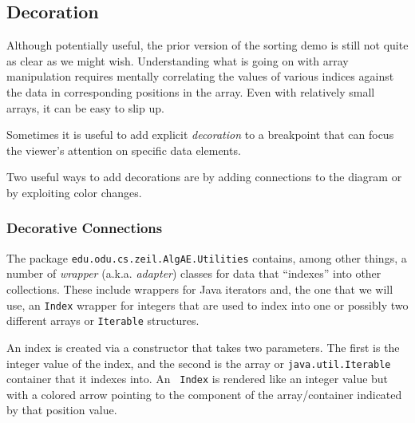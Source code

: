 \documentclass[11pt,titlepage]{book}
\begin{document}
\subsection{Decoration}

Although potentially useful, the prior version of the sorting demo is
still not quite as clear as we might wish. Understanding what is going
on with array manipulation requires mentally correlating the values of
various indices against the data in corresponding positions in the
array. Even with relatively small arrays, it can be easy to slip up.

Sometimes it is useful to add explicit {\em decoration} to a
breakpoint that can focus the viewer's attention on specific data
elements.

Two useful ways to add decorations are by adding connections to the
diagram or by exploiting color changes.



\subsubsection{Decorative Connections}

The package \texttt{edu.odu.cs.zeil.AlgAE.Utilities} contains, among
other things, a number of {\em wrapper} (a.k.a. {\em adapter}) classes
\cite{Gamma/patterns} for data that ``indexes'' into other
collections. These include wrappers for Java iterators and, the one
that we will use, an \texttt{Index} wrapper for integers that are used
to index into one or possibly two different arrays or {\tt Iterable}
structures.

An index is created via a constructor that takes two parameters. The
first is the integer value of the index, and the second is the array
or {\tt java.util.Iterable} container that it indexes into. An {\tt
Index} is rendered like an integer value but with a colored arrow
pointing to the component of the array/container indicated by that
position value.
\end{document}
